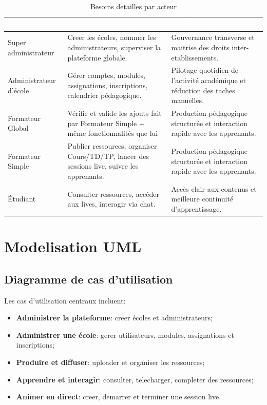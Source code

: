 \documentclass[12pt,a4paper,oneside]{report}
\begin{document}
\renewcommand{\arraystretch}{1.35}
\begin{longtable}{|p{2.8cm}|p{4.6cm}|p{4.6cm}|}
\caption{Besoins detailles par acteur}\label{tab:besoins_acteurs}\\
\hline
\rowcolor{ustoblue}
\textcolor{white}{\textbf{Acteur}} &
\textcolor{white}{\textbf{Besoins prioritaires}} &
\textcolor{white}{\textbf{Valeur attendue}} \\
\hline
Super administrateur &
Creer les écoles, nommer les administrateurs, superviser la plateforme globale. &
Gouvernance transverse et maitrise des droits inter-etablissements. \\
\hline
Administrateur d'école &
Gérer comptes, modules, assignations, inscriptions, calendrier pédagogique. &
Pilotage quotidien de l’activité académique et réduction des taches manuelles. \\
\hline
Formateur Global &
Vérifie et valide les ajouts fait par Formateur Simple + même fonctionnalités que lui &
Production pédagogique structurée et interaction rapide avec les apprenants. \\
\hline
Formateur Simple &
Publier ressources, organiser Cours/TD/TP, lancer des sessions live, suivre les apprenants. &
Production pédagogique structurée et interaction rapide avec les apprenants. \\
\hline
Étudiant &
Consulter ressources, accéder aux lives, interagir via chat. &
Accès clair aux contenus et meilleure continuité d'apprentissage. \\
\hline
\end{longtable}

\section{Modelisation UML}

\subsection{Diagramme de cas d'utilisation}

Les cas d'utilisation centraux incluent:
\begin{itemize}
  \item \textbf{Administrer la plateforme}: creer écoles et administrateurs;
  \item \textbf{Administrer une école}: gerer utilisateurs, modules, assignations et inscriptions;
  \item \textbf{Produire et diffuser}: uploader et organiser les ressources;
  \item \textbf{Apprendre et interagir}: consulter, telecharger, completer des ressources;
  \item \textbf{Animer en direct}: creer, demarrer et terminer une session live.
\end{itemize}
\end{document}
